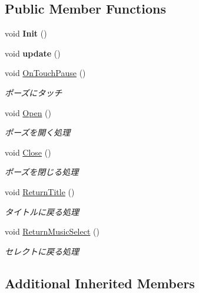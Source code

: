 \subsection*{Public Member Functions}
\begin{DoxyCompactItemize}
\item 
void {\bfseries Init} ()\hypertarget{class_pause_control_ab740dcc52a22cafa069e741a53b35b05}{}\label{class_pause_control_ab740dcc52a22cafa069e741a53b35b05}

\item 
void {\bfseries update} ()\hypertarget{class_pause_control_aee921761115f4a7a358989f4353de382}{}\label{class_pause_control_aee921761115f4a7a358989f4353de382}

\item 
void \hyperlink{class_pause_control_ae6ddd7c5a8341174cff9750d195edcf1}{On\+Touch\+Pause} ()
\begin{DoxyCompactList}\small\item\em ポーズにタッチ \end{DoxyCompactList}\item 
void \hyperlink{class_pause_control_a755b026ed1df770b94f3f04c74c1956b}{Open} ()
\begin{DoxyCompactList}\small\item\em ポーズを開く処理 \end{DoxyCompactList}\item 
void \hyperlink{class_pause_control_ab4a86be3d5d84c0b042f608a493dbe50}{Close} ()
\begin{DoxyCompactList}\small\item\em ポーズを閉じる処理 \end{DoxyCompactList}\item 
void \hyperlink{class_pause_control_a97be9c0cd95af026fa75760e96f824cc}{Return\+Title} ()
\begin{DoxyCompactList}\small\item\em タイトルに戻る処理 \end{DoxyCompactList}\item 
void \hyperlink{class_pause_control_aeedeaa20e5b1508183439c4172cbbec0}{Return\+Music\+Select} ()
\begin{DoxyCompactList}\small\item\em セレクトに戻る処理 \end{DoxyCompactList}\end{DoxyCompactItemize}
\subsection*{Additional Inherited Members}


